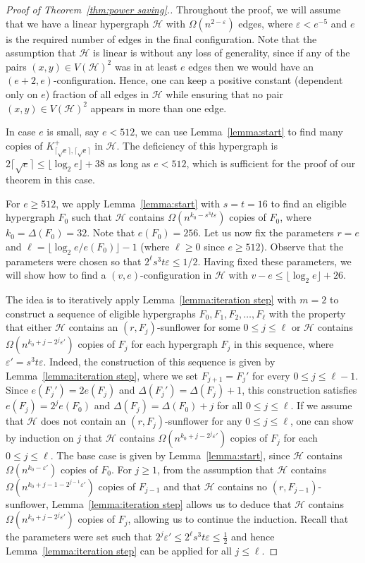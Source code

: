 \documentclass{daj}
\def\eps{\varepsilon}
\def\cH{\mathcal{H}}
\theoremstyle{plain}
\theoremstyle{remark}
\begin{document}
\begin{proof}[Proof of Theorem~\ref{thm:power saving}.]
Throughout the proof, we will assume that we have a linear hypergraph $\cH$ with $\Omega(n^{2-\eps})$ edges, where $\eps<e^{-5}$ and $e$ is the required number of edges in the final configuration. Note that the assumption that $\cH$ is linear is without any loss of generality, since if any of the pairs $(x, y)\in V(\cH)^2$ was in at least $e$ edges then we would have an $(e+2, e)$-configuration. Hence, one can keep a positive constant (dependent only on $e$) fraction of all edges in $\cH$ while ensuring that no pair $(x, y)\in V(\cH)^2$ appears in more than one edge.

In case $e$ is small, say $e<512$, we can use Lemma~\ref{lemma:start} to find many copies of $K_{\lceil \sqrt{e}\rceil, \lceil \sqrt{e}\rceil}^{+}$ in $\cH$. The deficiency of this hypergraph is $2\lceil\sqrt{e}\rceil\leq \lfloor \log_2 e\rfloor +38$ as long as $e<512$, which is sufficient for the proof of our theorem in this case.

For $e\geq 512$, we apply Lemma~\ref{lemma:start} with $s=t=16$ to find an eligible hypergraph $F_0$ such that $\cH$ contains $\Omega(n^{k_0-s^3 t \eps})$ copies of $F_0$, where $k_0=\Delta(F_0) = 32$. Note that $e(F_0) = 256$. Let us now fix the parameters $r=e$ and $\ell=\lfloor \log_2 e/e(F_0)\rfloor-1$ (where $\ell\geq 0$ since $e\geq 512$). Observe that the parameters were chosen so that $2^\ell s^3t \eps\leq 1/2$. Having fixed these parameters, we will show how to find a $(v, e)$-configuration in $\cH$ with $v-e\leq \lfloor \log_2 e\rfloor +26$.

The idea is to iteratively apply Lemma~\ref{lemma:iteration step} with $m=2$ to construct a sequence of eligible hypergraphs $F_0, F_1, F_2, \dots, F_\ell$ with the property that either $\cH$ contains an $(r, F_j)$-sunflower for some $0\leq j\leq \ell$ or $\cH$ contains $\Omega(n^{k_0+j-2^j \eps'})$ copies of $F_j$ for each hypergraph $F_j$ in this sequence, where $\eps'=s^3t\eps$. Indeed, the construction of this sequence is given by Lemma~\ref{lemma:iteration step}, where we set $F_{j+1}=F_j'$ for every $0 \le j \le \ell-1$. Since $e(F_j')=2e(F_j)$ and $\Delta(F_j')=\Delta(F_j)+1$, this construction satisfies $e(F_j)=2^je(F_0)$ and $\Delta(F_j)=\Delta(F_0)+j$ for all $0 \le j \le \ell$.
If we assume that $\cH$ does not contain an $(r, F_j)$-sunflower for any $0\leq j\leq \ell$, one can show by induction on $j$ that $\cH$ contains $\Omega(n^{k_0+j-2^j \eps'})$ copies of $F_j$ for each $0\leq j\leq \ell$. The base case is given by Lemma~\ref{lemma:start}, since $\cH$ contains $\Omega(n^{k_0-\eps'})$ copies of $F_0$. For $j\ge 1$, from the assumption that $\cH$ contains $\Omega(n^{k_0+j-1-2^{j-1}\eps'})$ copies of $F_{j-1}$ and that $\cH$ contains no $(r, F_{j-1})$-sunflower, Lemma~\ref{lemma:iteration step} allows us to deduce that $\cH$ contains $\Omega(n^{k_0+j-2^j \eps'})$ copies of $F_j$, allowing us to continue the induction. Recall that the parameters were set such that $2^j \eps'\leq 2^\ell s^3 t\eps \leq \frac{1}{2}$ and hence Lemma~\ref{lemma:iteration step} can be applied for all $j\leq \ell$.


\end{proof}
\end{document}
